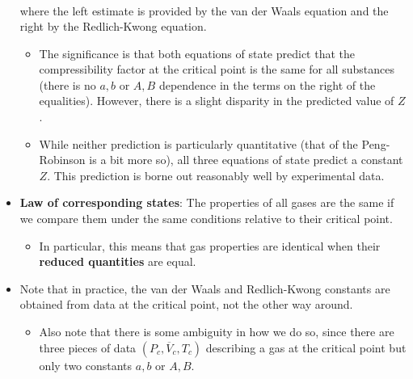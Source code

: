 \documentclass[../notes.tex]{subfiles}
\begin{document}
\begin{itemize}
\begin{align*}
    \end{align*}
    where the left estimate is provided by the van der Waals equation and the right by the Redlich-Kwong equation.
    \begin{itemize}
        \item The significance is that both equations of state predict that the compressibility factor at the critical point is the same for all substances (there is no $a,b$ or $A,B$ dependence in the terms on the right of the equalities). However, there is a slight disparity in the predicted value of $Z$.
        \item While neither prediction is particularly quantitative (that of the Peng-Robinson is a bit more so), all three equations of state predict a constant $Z$. This prediction is borne out reasonably well by experimental data.
    \end{itemize}
    \item \textbf{Law of corresponding states}: The properties of all gases are the same if we compare them under the same conditions relative to their critical point.
    \begin{itemize}
        \item In particular, this means that gas properties are identical when their \textbf{reduced quantities} are equal.
    \end{itemize}
    \item Note that in practice, the van der Waals and Redlich-Kwong constants are obtained from data at the critical point, not the other way around.
    \begin{itemize}
        \item Also note that there is some ambiguity in how we do so, since there are three pieces of data $(P_c,\overline{V}_c,T_c)$ describing a gas at the critical point but only two constants $a,b$ or $A,B$.
    \end{itemize}
\end{itemize}
\end{document}
